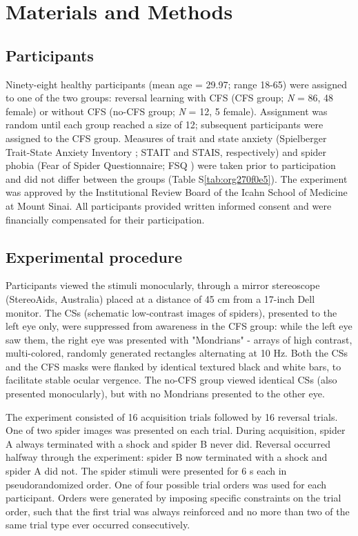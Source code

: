 \documentclass[12pt]{article}
\begin{document}
\section*{Materials and Methods}
\label{sec:orgcd39cff}
\subsection*{Participants}
\label{sec:org2d2f2c5}
Ninety-eight healthy participants (mean age = 29.97; range 18-65) were
assigned to one of the two groups: reversal learning with CFS (CFS
group; \emph{N} = 86, 48 female) or without CFS (no-CFS group; \emph{N} = 12, 5
female). Assignment was random until each group reached a size of 12;
subsequent participants were assigned to the CFS group. Measures of
trait and state anxiety (Spielberger Trait-State Anxiety Inventory
\cite{Spielberger1983}; STAIT and STAIS, respectively) and spider
phobia (Fear of Spider Questionnaire; FSQ \cite{Szymanski1995}) were
taken prior to participation and did not differ between the groups
(Table S\ref{tab:org270f0e5}). The experiment was approved by the Institutional
Review Board of the Icahn School of Medicine at Mount Sinai. All
participants provided written informed consent and were financially
compensated for their participation.

\subsection*{Experimental procedure}
\label{sec:orga739576}
Participants viewed the stimuli monocularly, through a mirror
stereoscope (StereoAids, Australia) placed at a distance of 45 cm from a
17-inch Dell monitor. The CSs (schematic low-contrast images of
spiders), presented to the left eye only, were suppressed from awareness
in the CFS group: while the left eye saw them, the right eye was
presented with "Mondrians" - arrays of high contrast, multi-colored,
randomly generated rectangles alternating at 10 Hz. Both the CSs and the
CFS masks were flanked by identical textured black and white bars, to
facilitate stable ocular vergence. The no-CFS group viewed identical CSs
(also presented monocularly), but with no Mondrians presented to the
other eye.

The experiment consisted of 16 acquisition trials followed by 16
reversal trials. One of two spider images was presented on each
trial. During acquisition, spider A always terminated with a shock and
spider B never did. Reversal occurred halfway through the experiment:
spider B now terminated with a shock and spider A did not. The spider
stimuli were presented for 6 s each in pseudorandomized order. One of
four possible trial orders was used for each participant. Orders were
generated by imposing specific constraints on the trial order, such that
the first trial was always reinforced and no more than two of the same
trial type ever occurred consecutively.
\end{document}
